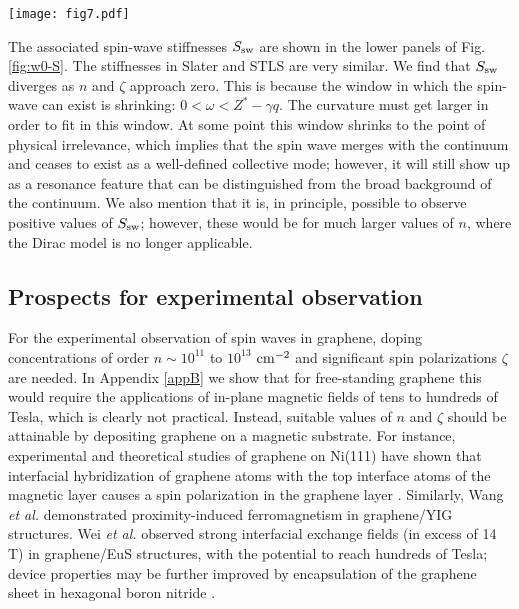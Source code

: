 \documentclass[aps,prb,twocolumn,superscriptaddress]{revtex4-2}
\newcommand{\w}{\omega}
\newcommand{\z}{\zeta}
\begin{document}
\begin{figure*}
  \texttt{[image: fig7.pdf]}
  \caption{Top left: The pseudo-Larmor frequency, $\w_L$, of spin-waves calculated with the Slater approximation and scaled by the renormalized Zeeman energy, $Z^*$.
           The red line indicates where $Z^*-\w_L = 0.5 \text{meV}$.
           Bottom left: The spin-wave stiffness calculated with the Slater approximation.
           The stiffness diverges as it approaches the origin.
           Right: The same as the left but calculated with the STLS scheme.}
   \label{fig:w0-S}
\end{figure*}


The associated spin-wave stiffnesses $S_{\rm sw}$ are shown in the lower panels of Fig. \ref{fig:w0-S}. The stiffnesses in Slater and STLS are
very similar. We find that $S_{\rm sw}$ diverges as $n$ and $\z$ approach zero.
This is because the window in which the spin-wave can exist is shrinking: $0 < \w < Z^*-\gamma q$.
The curvature must get larger in order to fit in this window. At some point this window shrinks to the point of physical irrelevance, which
implies that the spin wave merges with the continuum and ceases to exist as a well-defined collective mode; however, it will still show up as a
resonance feature that can be distinguished from the broad background of the continuum.
We also mention that it is, in principle, possible to observe positive values of $S_{\rm sw}$; however, these would be  for much larger values
of $n$, where the Dirac model is no longer applicable.

\subsection{Prospects for experimental observation}\label{sec4B}

For the experimental observation of spin waves in graphene, doping concentrations
of order $n\sim 10^{11}$ to $10^{13}$ $\rm cm^{-2}$ and significant spin polarizations $\zeta$ are needed. In Appendix \ref{appB} we show that for free-standing
graphene this would require the applications of in-plane magnetic fields of tens to hundreds of Tesla,
which is clearly not practical. Instead, suitable values of $n$ and $\zeta$ should be attainable by depositing graphene on a magnetic substrate.
For instance, experimental and theoretical studies of graphene on Ni(111) have shown that interfacial hybridization of graphene atoms with the top interface
atoms of the magnetic layer causes a spin polarization in the graphene layer \cite{Varykhalov2008,Abtew2013,Peralta2019}. Similarly,
Wang {\em et al.} \cite{Wang2015} demonstrated proximity-induced ferromagnetism in graphene/YIG structures. Wei {\em et al.} \cite{Wei2016}
observed strong interfacial exchange fields (in excess of 14 T) in graphene/EuS structures, with the potential to reach hundreds of Tesla;
device properties may be further improved by encapsulation of the graphene sheet in hexagonal boron nitride \cite{Wang2020}.
\end{document}

